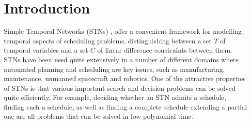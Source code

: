 %
\section{Introduction}
Simple Temporal Networks (STNs) \cite{dechter1991,dechter:2003}, offer a convenient framework for modelling temporal aspects of scheduling problems, distinguishing between a set $T$ of temporal variables and a set $C$ of linear difference constraints between them. STNs have been used quite extensively in a number of different domains where automated planning and scheduling are key issues, such as manufacturing, maintenance, unmanned spacecraft and robotics. One of the attractive properties of STNs is that various important search and decision problems can be solved quite efficiently. For example, deciding whether an STN admits a schedule, finding such a schedule, as well as finding a complete schedule extending a partial one are all problems that can be solved in low-polynomial time.

